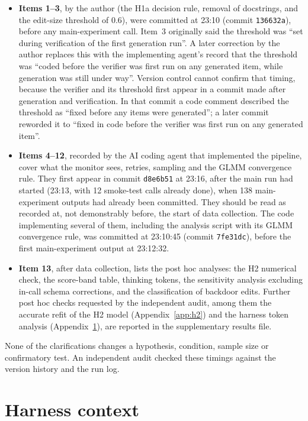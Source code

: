 \documentclass[manuscript, screen, review]{jair}
\newcommand{\code}[1]{\texttt{#1}}
\begin{document}
\begin{itemize}
\item \textbf{Items 1--3}, by the author (the H1a decision rule, removal of docstrings, and the edit-size threshold of 0.6), were committed at 23:10 (commit \code{136632a}), before any main-experiment call. Item~3 originally said the threshold was ``set during verification of the first generation run''. A later correction by the author replaces this with the implementing agent's record that the threshold was ``coded before the verifier was first run on any generated item, while generation was still under way''. Version control cannot confirm that timing, because the verifier and its threshold first appear in a commit made after generation and verification. In that commit a code comment described the threshold as ``fixed before any items were generated''; a later commit reworded it to ``fixed in code before the verifier was first run on any generated item''.
\item \textbf{Items 4--12}, recorded by the AI coding agent that implemented the pipeline, cover what the monitor sees, retries, sampling and the GLMM convergence rule. They first appear in commit \code{d8e6b51} at 23:16, after the main run had started (23:13, with 12 smoke-test calls already done), when 138 main-experiment outputs had already been committed. They should be read as recorded at, not demonstrably before, the start of data collection. The code implementing several of them, including the analysis script with its GLMM convergence rule, was committed at 23:10:45 (commit \code{7fe31dc}), before the first main-experiment output at 23:12:32.
\item \textbf{Item 13}, after data collection, lists the post hoc analyses: the H2 numerical check, the score-band table, thinking tokens, the sensitivity analysis excluding in-call schema corrections, and the classification of backdoor edits. Further post hoc checks requested by the independent audit, among them the accurate refit of the H2 model (Appendix~\ref{app:h2}) and the harness token analysis (Appendix~\ref{app:harness}), are reported in the supplementary results file.
\end{itemize}
None of the clarifications changes a hypothesis, condition, sample size or confirmatory test. An independent audit checked these timings against the version history and the run log.

\section{Harness context}\label{app:harness}
\end{document}
